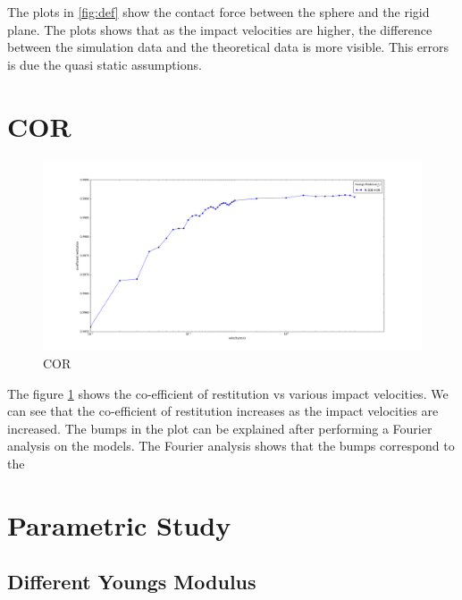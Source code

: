 The plots in \ref{fig:def} show the contact force between the sphere and the rigid plane. The plots shows that as the impact velocities are higher, the difference between the simulation data and the theoretical data is more visible. This errors is due the quasi static assumptions.



\section{COR}

\begin{figure}[H]
\includegraphics[width=1.0\textwidth]{../images/COR/COR.png}
\caption{COR}
\label{fig:COR}
\end{figure}

The figure \ref{fig:COR} shows the co-efficient of restitution vs various impact velocities. We can see that the co-efficient of restitution increases as the impact velocities are increased. The bumps in the plot can be explained after performing a Fourier analysis on the models. The Fourier analysis shows that the bumps correspond to the 


\section{Parametric Study}

\subsection{Different Youngs Modulus}

\begin{figure}[H]
\end{figure}



